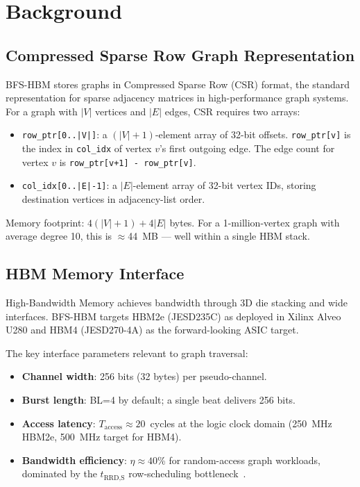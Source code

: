 \section{Background}

\subsection{Compressed Sparse Row Graph Representation}

BFS-HBM stores graphs in Compressed Sparse Row (CSR) format, the standard
representation for sparse adjacency matrices in high-performance graph systems.
For a graph with $|V|$ vertices and $|E|$ edges, CSR requires two arrays:

\begin{itemize}[leftmargin=*,itemsep=2pt]
\item \texttt{row\_ptr[0..|V|]}: a $(|V|+1)$-element array of 32-bit offsets.
  \texttt{row\_ptr[v]} is the index in \texttt{col\_idx} of vertex $v$'s first
  outgoing edge. The edge count for vertex $v$ is
  \texttt{row\_ptr[v+1] - row\_ptr[v]}.
\item \texttt{col\_idx[0..|E|-1]}: a $|E|$-element array of 32-bit vertex IDs,
  storing destination vertices in adjacency-list order.
\end{itemize}

Memory footprint: $4(|V|+1) + 4|E|$ bytes. For a 1-million-vertex graph with
average degree 10, this is $\approx$44~MB — well within a single HBM stack.

\subsection{HBM Memory Interface}

High-Bandwidth Memory achieves bandwidth through 3D die stacking and wide interfaces.
BFS-HBM targets HBM2e (JESD235C) as deployed in Xilinx Alveo U280 and HBM4
(JESD270-4A) as the forward-looking ASIC target.

The key interface parameters relevant to graph traversal:
\begin{itemize}[leftmargin=*,itemsep=2pt]
\item \textbf{Channel width}: 256 bits (32 bytes) per pseudo-channel.
\item \textbf{Burst length}: BL=4 by default; a single beat delivers 256 bits.
\item \textbf{Access latency}: $T_\text{access} \approx 20$~cycles at the logic
  clock domain (250~MHz HBM2e, 500~MHz target for HBM4).
\item \textbf{Bandwidth efficiency}: $\eta \approx 40$\% for random-access graph
  workloads, dominated by the $t_\text{RRD,S}$ row-scheduling bottleneck~\cite{fritz2026rmwwall}.
\end{itemize}

